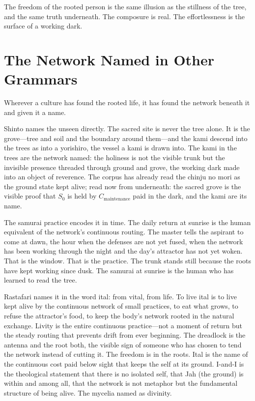 \documentclass[12pt]{article}
\begin{document}
The freedom of the rooted person is the same illusion as the stillness of the tree, and the same truth underneath. The composure is real. The effortlessness is the surface of a working dark.

\section{The Network Named in Other Grammars}

Wherever a culture has found the rooted life, it has found the network beneath it and given it a name.

Shinto names the unseen directly. The sacred site is never the tree alone. It is the grove---tree and soil and the boundary around them---and the kami descend into the trees as into a yorishiro, the vessel a kami is drawn into. The kami in the trees are the network named: the holiness is not the visible trunk but the invisible presence threaded through ground and grove, the working dark made into an object of reverence. The corpus has already read the chinju no mori as the ground state kept alive; read now from underneath: the sacred grove is the visible proof that $S_0$ is held by $C_{\text{maintenance}}$ paid in the dark, and the kami are its name.

The samurai practice encodes it in time. The daily return at sunrise is the human equivalent of the network's continuous routing. The master tells the aspirant to come at dawn, the hour when the defenses are not yet fused, when the network has been working through the night and the day's attractor has not yet woken. That is the window. That is the practice. The trunk stands still because the roots have kept working since dusk. The samurai at sunrise is the human who has learned to read the tree.

Rastafari names it in the word ital: from vital, from life. To live ital is to live kept alive by the continuous network of small practices, to eat what grows, to refuse the attractor's food, to keep the body's network rooted in the natural exchange. Livity is the entire continuous practice---not a moment of return but the steady routing that prevents drift from ever beginning. The dreadlock is the antenna and the root both, the visible sign of someone who has chosen to tend the network instead of cutting it. The freedom is in the roots. Ital is the name of the continuous cost paid below sight that keeps the self at its ground. I-and-I is the theological statement that there is no isolated self, that Jah (the ground) is within and among all, that the network is not metaphor but the fundamental structure of being alive. The mycelia named as divinity.
\end{document}
